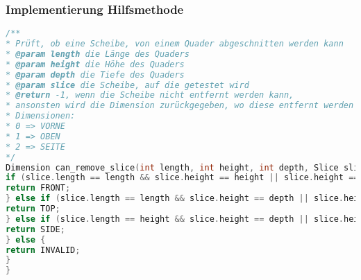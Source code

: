 \documentclass[a4paper,10pt,ngerman]{scrartcl}
\begin{document}
    \subsubsection{Implementierung Hilfsmethode}
    \begin{lstlisting}[frame=single,language=C++,title=Methode can\_remove\_slice,breaklines=true,label={lst:code_canRemoveSlice}]
/**
* Prüft, ob eine Scheibe, von einem Quader abgeschnitten werden kann
* @param length die Länge des Quaders
* @param height die Höhe des Quaders
* @param depth die Tiefe des Quaders
* @param slice die Scheibe, auf die getestet wird
* @return -1, wenn die Scheibe nicht entfernt werden kann,
* ansonsten wird die Dimension zurückgegeben, wo diese entfernt werden kann
* Dimensionen:
* 0 => VORNE
* 1 => OBEN
* 2 => SEITE
*/
Dimension can_remove_slice(int length, int height, int depth, Slice slice) {
if (slice.length == length && slice.height == height || slice.height == length && slice.length == height) {
return FRONT;
} else if (slice.length == length && slice.height == depth || slice.height == length && slice.length == depth) {
return TOP;
} else if (slice.length == height && slice.height == depth || slice.height == height && slice.length == depth) {
return SIDE;
} else {
return INVALID;
}
}
    \end{lstlisting}

    \newpage
\end{document}
